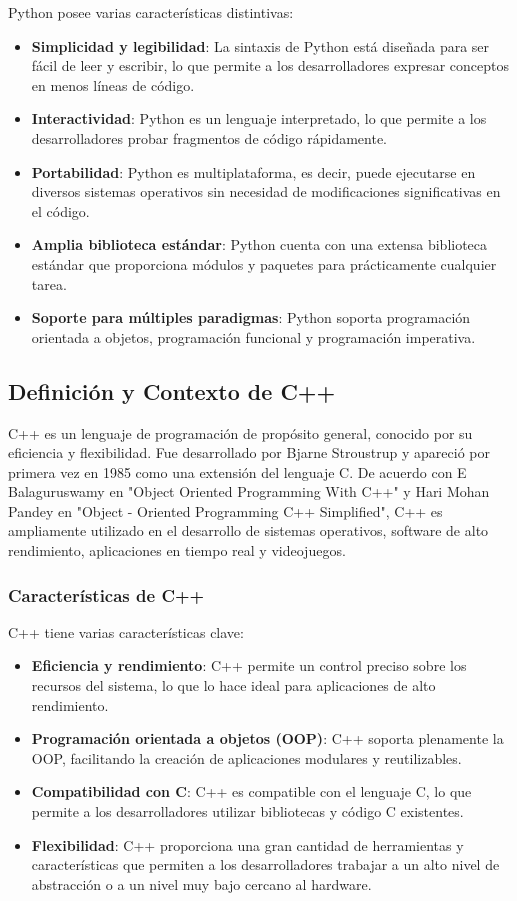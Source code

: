 \documentclass[12pt]{article}
\begin{document}
	Python posee varias características distintivas:
	\begin{itemize}
		\item \textbf{Simplicidad y legibilidad}: La sintaxis de Python está diseñada para ser fácil de leer y escribir, lo que permite a los desarrolladores expresar conceptos en menos líneas de código.
		\item \textbf{Interactividad}: Python es un lenguaje interpretado, lo que permite a los desarrolladores probar fragmentos de código rápidamente.
		\item \textbf{Portabilidad}: Python es multiplataforma, es decir, puede ejecutarse en diversos sistemas operativos sin necesidad de modificaciones significativas en el código.
		\item \textbf{Amplia biblioteca estándar}: Python cuenta con una extensa biblioteca estándar que proporciona módulos y paquetes para prácticamente cualquier tarea.
		\item \textbf{Soporte para múltiples paradigmas}: Python soporta programación orientada a objetos, programación funcional y programación imperativa.
	\end{itemize}
	
	\subsection{Definición y Contexto de C++}
	
	C++ es un lenguaje de programación de propósito general, conocido por su eficiencia y flexibilidad. Fue desarrollado por Bjarne Stroustrup y apareció por primera vez en 1985 como una extensión del lenguaje C. De acuerdo con E Balaguruswamy en "Object Oriented Programming With C++" y Hari Mohan Pandey en "Object - Oriented Programming C++ Simplified", C++ es ampliamente utilizado en el desarrollo de sistemas operativos, software de alto rendimiento, aplicaciones en tiempo real y videojuegos.
	
	\subsubsection{Características de C++}
	
	C++ tiene varias características clave:
	\begin{itemize}
		\item \textbf{Eficiencia y rendimiento}: C++ permite un control preciso sobre los recursos del sistema, lo que lo hace ideal para aplicaciones de alto rendimiento.
		\item \textbf{Programación orientada a objetos (OOP)}: C++ soporta plenamente la OOP, facilitando la creación de aplicaciones modulares y reutilizables.
		\item \textbf{Compatibilidad con C}: C++ es compatible con el lenguaje C, lo que permite a los desarrolladores utilizar bibliotecas y código C existentes.
		\item \textbf{Flexibilidad}: C++ proporciona una gran cantidad de herramientas y características que permiten a los desarrolladores trabajar a un alto nivel de abstracción o a un nivel muy bajo cercano al hardware.
	\end{itemize}
	
\end{document}
